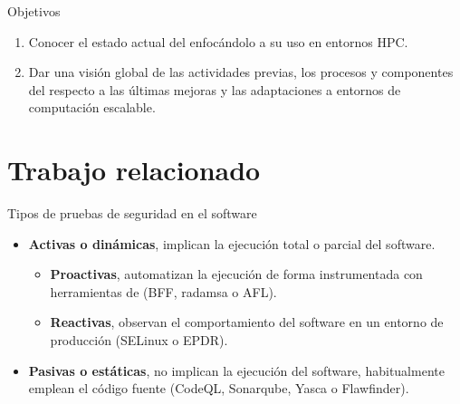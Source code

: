 \documentclass[aspectratio=169]{beamer}
\begin{document}
\begin{frame}{Objetivos}
\begin{enumerate}
    \item Conocer el estado actual del {\fz} enfocándolo a su uso en entornos HPC.
    \item Dar una visión global de las actividades previas, los procesos y componentes del {\fz} respecto a las últimas mejoras y las adaptaciones a entornos de computación escalable.
\end{enumerate}            



\end{frame}

\section{Trabajo relacionado}
\frame{\sectionpage}

\begin{frame}{Tipos de pruebas de seguridad en el software~\cite{fuzz_ref_sec-qa_sw}}

 \begin{itemize}
  \item \textbf{Activas o dinámicas}, implican la ejecución total o parcial del software.
   \begin{itemize}
    \item \textbf{Proactivas}, automatizan la ejecución de forma instrumentada con herramientas de {\fz} (BFF, radamsa o AFL).
    \item \textbf{Reactivas}, observan el comportamiento del software en un entorno de producción (SELinux o EPDR).
   \end{itemize} 
  \item  \textbf{Pasivas o estáticas}, no implican la ejecución del software, habitualmente emplean el código fuente (CodeQL, Sonarqube, Yasca o Flawfinder).
 \end{itemize}


\end{frame}
\end{document}
